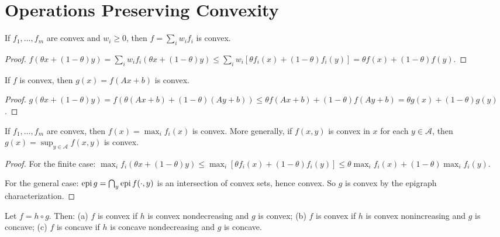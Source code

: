 \documentclass[11pt,a4paper]{article}
\begin{document}

\section{Operations Preserving Convexity}

\begin{proposition}
\label{prop:nonneg-sum}
If $f_1, \ldots, f_m$ are convex and $w_i \ge 0$, then
$f = \sum_i w_i f_i$ is convex.
\end{proposition}

\begin{proof}
$f(\theta x + (1-\theta)y) = \sum_i w_i f_i(\theta x + (1-\theta)y) \le
\sum_i w_i[\theta f_i(x) + (1-\theta) f_i(y)] =
\theta f(x) + (1-\theta) f(y)$.
\end{proof}

\begin{proposition}
\label{prop:affine-comp}
If $f$ is convex, then $g(x) = f(Ax + b)$ is convex.
\end{proposition}

\begin{proof}
$g(\theta x + (1-\theta)y) = f(\theta(Ax+b) + (1-\theta)(Ay+b)) \le
\theta f(Ax+b) + (1-\theta) f(Ay+b) = \theta g(x) + (1-\theta) g(y)$.
\end{proof}

\begin{proposition}
\label{prop:pointwise-sup}
If $f_1, \ldots, f_m$ are convex, then $f(x) = \max_i f_i(x)$ is convex.
More generally, if $f(x,y)$ is convex in $x$ for each $y \in \mathcal{A}$,
then $g(x) = \sup_{y \in \mathcal{A}} f(x,y)$ is convex.
\end{proposition}

\begin{proof}
For the finite case: $\max_i f_i(\theta x + (1-\theta)y) \le
\max_i[\theta f_i(x) + (1-\theta) f_i(y)] \le
\theta \max_i f_i(x) + (1-\theta) \max_i f_i(y)$.

For the general case: $\operatorname{epi} g = \bigcap_{y} \operatorname{epi} f(\cdot, y)$ is an
intersection of convex sets, hence convex.  So $g$ is convex by the epigraph
characterization.
\end{proof}

\begin{proposition}
\label{prop:scalar-composition}
Let $f = h \circ g$.  Then:
(a) $f$ is convex if $h$ is convex nondecreasing and $g$ is convex;
(b) $f$ is convex if $h$ is convex nonincreasing and $g$ is concave;
(c) $f$ is concave if $h$ is concave nondecreasing and $g$ is concave.
\end{proposition}
\end{document}
